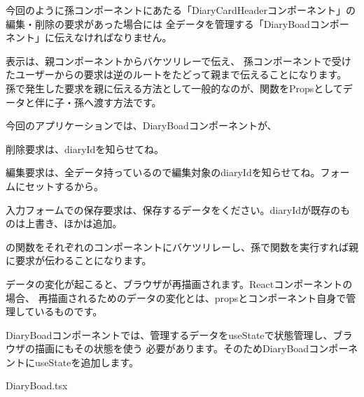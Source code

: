 今回のように孫コンポーネントにあたる「DiaryCardHeaderコンポーネント」の編集・削除の要求があった場合には
全データを管理する「DiaryBoadコンポーネント」に伝えなければなりません。

\vspace*{\baselineskip}

表示は、親コンポーネントからバケツリレーで伝え、
孫コンポーネントで受けたユーザーからの要求は逆のルートをたどって親まで伝えることになります。
孫で発生した要求を親に伝える方法として一般的なのが、関数をPropsとしてデータと伴に子・孫へ渡す方法です。

\vspace*{\baselineskip}

今回のアプリケーションでは、DiaryBoadコンポーネントが、

\begin{starteritemize}
\item 削除要求は、diaryIdを知らせてね。
\item 編集要求は、全データ持っているので編集対象のdiaryIdを知らせてね。フォームにセットするから。
\item 入力フォームでの保存要求は、保存するデータをください。diaryIdが既存のものは上書き、ほかは追加。
\end{starteritemize}

の関数をそれぞれのコンポーネントにバケツリレーし、孫で関数を実行すれば親に要求が伝わることになります。

\vspace*{\baselineskip}

データの変化が起こると、ブラウザが再描画されます。Reactコンポーネントの場合、
再描画されるためのデータの変化とは、propsとコンポーネント自身で管理しているものです。

\vspace*{\baselineskip}

DiaryBoadコンポーネントでは、管理するデータをuseStateで状態管理し、ブラウザの描画にもその状態を使う
必要があります。そのためDiaryBoadコンポーネントにuseStateを追加します。

\def\startercodeblockfontsize{}
\begin{starterprogram}[]{DiaryBoad.tsx}\end{starterprogram}

